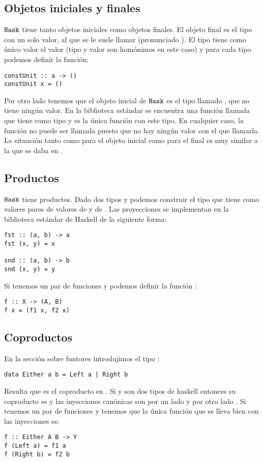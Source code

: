 \subsection{Objetos iniciales y finales}
$\texttt{Hask}$ tiene tanto objetos iniciales como objetos finales. El
objeto final es el tipo con un solo valor, al que se le suele llamar
\cod{()} (pronunciado ). El tipo \cod{()} tiene
como único valor el valor \cod{()} (tipo y valor
son homónimos en este caso) y para cada tipo  podemos
definir la función:
\begin{verbatim}
constUnit :: a -> ()
constUnit x = ()
\end{verbatim}
Por otro lado tenemos que el objeto inicial de $\texttt{Hask}$ es el tipo
llamado , que no tiene ningún valor. En la biblioteca
estándar se encuentra una función llamada 
que tiene
como tipo  y es la única función con este tipo.
En cualquier caso, la función no puede ser llamada puesto que no
hay ningún valor con el que llamarla. La situación tanto como para
el objeto inicial como para el final es muy similar a la que se daba
en \Set.

\subsection{Productos}
$\texttt{Hask}$ tiene productos. Dado dos tipos  y
 podemos construir el tipo  que tiene
como valores pares de valores de  y de .
Las proyecciones se implementan en la biblioteca estándar de
Haskell de la siguiente forma:

\begin{verbatim}
fst :: (a, b) -> a
fst (x, y) = x

snd :: (a, b) -> b
snd (x, y) = y
\end{verbatim}

Si tenemos un par de funciones  y
 podemos definir la función :
\begin{verbatim}
f :: X -> (A, B)
f x = (f1 x, f2 x)
\end{verbatim}

\subsection{Coproductos}
En la sección sobre funtores introdujimos el tipo :
\begin{verbatim}
data Either a b = Left a | Right b
\end{verbatim}
Resulta que  es el coproducto en . Si
 y  son dos tipos de haskell entonces su coproducto
es  y las inyecciones canónicas son por un lado
 y por otro lado
. Si tenemos un par de funciones
 y  tenemos que la única
función  que se lleva bien con las inyecciones
es:
\begin{verbatim}
f :: Either A B -> Y
f (Left a) = f1 a
f (Right b) = f2 b
\end{verbatim}

